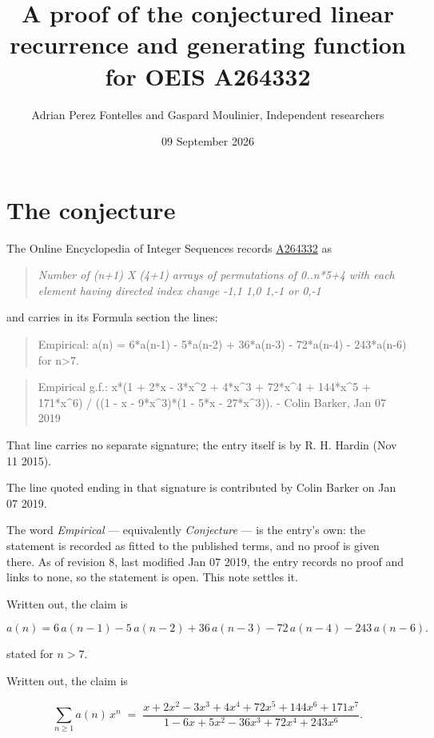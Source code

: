 \documentclass[11pt]{article}
\title{A proof of the conjectured linear recurrence and generating function for OEIS A264332}
\author{Adrian Perez Fontelles and Gaspard Moulinier, Independent researchers}
\date{09 September 2026}
\theoremstyle{definition}
\begin{document}
\maketitle
\section{The conjecture}

The Online Encyclopedia of Integer Sequences records \href{https://oeis.org/A264332}{A264332} as

\begin{quote}\itshape Number of (n+1) X (4+1) arrays of permutations of 0..n*5+4 with each element having directed index change -1,1 1,0 1,-1 or 0,-1\end{quote}

and carries in its Formula section the lines:

\begin{quote}\ttfamily Empirical: a(n) = 6*a(n-1) - 5*a(n-2) + 36*a(n-3) - 72*a(n-4) - 243*a(n-6) for n>7.\end{quote}

\begin{quote}\ttfamily Empirical g.f.: x*(1 + 2*x - 3*x\textasciicircum{}2 + 4*x\textasciicircum{}3 + 72*x\textasciicircum{}4 + 144*x\textasciicircum{}5 + 171*x\textasciicircum{}6) / ((1 - x - 9*x\textasciicircum{}3)*(1 - 5*x - 27*x\textasciicircum{}3)). - Colin Barker, Jan 07 2019\end{quote}

That line carries no separate signature; the entry itself is by R. H. Hardin (Nov 11 2015).

The line quoted ending in that signature is contributed by Colin Barker on Jan 07 2019.

The word {\itshape Empirical} --- equivalently {\itshape Conjecture} --- is the entry's own: the statement is recorded as fitted to the published terms, and no proof is given there. As of revision 8, last modified Jan 07 2019, the entry records no proof and links to none, so the statement is open. This note settles it.

Written out, the claim is

\[a(n) = 6\,a(n-1) - 5\,a(n-2) + 36\,a(n-3) - 72\,a(n-4) - 243\,a(n-6).\]

stated for $n > 7$.

Written out, the claim is

\[\sum_{n \ge 1} a(n)\,x^n \;=\; \frac{x + 2x^{2} - 3x^{3} + 4x^{4} + 72x^{5} + 144x^{6} + 171x^{7}}{1 - 6x + 5x^{2} - 36x^{3} + 72x^{4} + 243x^{6}}.\]
\end{document}

